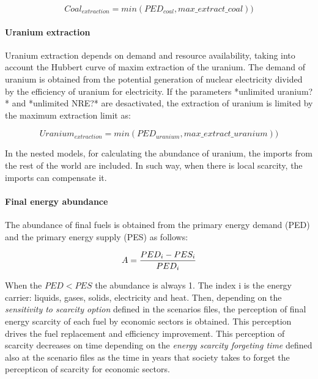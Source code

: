 \begin{equation}
Coal_{extraction}=min(PED_{coal}, max\_extract\_coal))
\label{eq:coal-extraction}
\end{equation}

\paragraph{Uranium extraction}

Uranium extraction depends on demand and resource availability, taking into account the Hubbert curve of maxim extraction of the uranium. The demand of uranium is obtained from the potential generation of nuclear electricity divided by the efficiency of uranium for electricity. If the parameters *unlimited uranium?* and *unlimited NRE?* are desactivated, the extraction of uranium is limited by the maximum extraction limit as:

\begin{equation}
Uranium_{extraction}=min(PED_{uranium}, max\_extract\_uranium))
\label{eq:uranium-extraction}
\end{equation}

In the nested models, for calculating the abundance of uranium, the imports from the rest of the world are included. In such way, when there is local scarcity, the imports can compensate it.


\paragraph{Final energy abundance}

The abundance of final fuels is obtained from the primary energy demand (PED) and the primary energy supply (PES) as follows:

\begin{equation}
A= {{PED_i-PES_i} \over {PED_i}}
\label{eq:abundance-final-fuels}
\end{equation}

When the $PED<PES$ the abundance is always 1. The index i is the energy carrier: liquids, gases, solids, electricity and heat.
Then, depending on the \emph{sensitivity to scarcity option} defined in the scenarios files, the perception of final energy scarcity of each fuel by economic sectors is obtained. This perception drives the fuel replacement and efficiency improvement. This perception of scarcity decreases on time depending on the \emph{energy scarcity forgeting time} defined also at the scenario files as the time in years that society takes to forget the percepticon of scarcity for economic sectors.